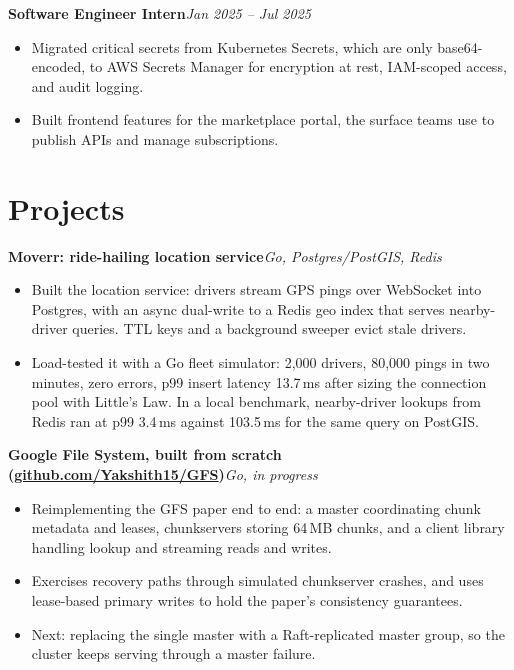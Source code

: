 \documentclass[letterpaper,10pt]{article}
\newcommand{\role}[2]{%
  \textbf{#1}\hfill\textit{#2}\par\vspace{0.15em}%
}
\begin{document}
\vspace{0.4em}
\role{Software Engineer Intern}{Jan 2025 -- Jul 2025}
\begin{itemize}
  \item Migrated critical secrets from Kubernetes Secrets, which are only base64-encoded, to
        AWS Secrets Manager for encryption at rest, IAM-scoped access, and audit logging.
  \item Built frontend features for the marketplace portal, the surface teams use to publish
        APIs and manage subscriptions.
\end{itemize}

\section{Projects}

\role{Moverr: ride-hailing location service}{Go, Postgres/PostGIS, Redis}
\begin{itemize}
  \item Built the location service: drivers stream GPS pings over WebSocket into Postgres,
        with an async dual-write to a Redis geo index that serves nearby-driver queries.
        TTL keys and a background sweeper evict stale drivers.
  \item Load-tested it with a Go fleet simulator: 2,000 drivers, 80,000 pings in two
        minutes, zero errors, p99 insert latency 13.7\,ms after sizing the connection pool
        with Little's Law. In a local benchmark, nearby-driver lookups from Redis ran at p99
        3.4\,ms against 103.5\,ms for the same query on PostGIS.
\end{itemize}

\vspace{0.4em}
\role{Google File System, built from scratch
  \textnormal{(\href{https://github.com/Yakshith15/GFS}{github.com/Yakshith15/GFS})}}{Go, in progress}
\begin{itemize}
  \item Reimplementing the GFS paper end to end: a master coordinating chunk metadata and
        leases, chunkservers storing 64\,MB chunks, and a client library handling lookup and
        streaming reads and writes.
  \item Exercises recovery paths through simulated chunkserver crashes, and uses
        lease-based primary writes to hold the paper's consistency guarantees.
  \item Next: replacing the single master with a Raft-replicated master group, so the
        cluster keeps serving through a master failure.
\end{itemize}
\end{document}
